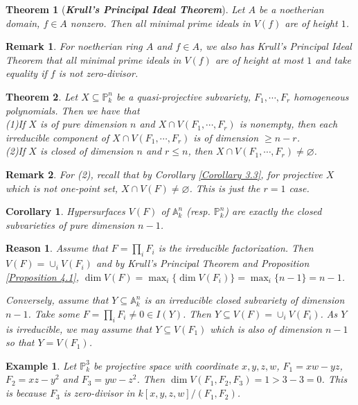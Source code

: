 \documentclass{ctexart}
\newtheorem{remark}{Remark}[section]
\newtheorem{theorem}{Theorem}[section]
\newtheorem{reason}{Reason}[section]
\newtheorem{example}{Example}[section]
\newtheorem{corollary}{Corollary}[section]
\begin{document}
\begin{theorem}[\textbf{\emph{Krull's Principal Ideal Theorem}}]
    Let $A$ be a noetherian domain, $f\in A$ nonzero.
    Then all minimal prime ideals in $V(f)$ are of height $1$.
    \label{Theorem 4.3}
\end{theorem}
\begin{remark}
    For noetherian ring $A$ and $f\in A$, we also has Krull's Principal Ideal Theorem that all minimal prime ideals in $V(f)$ are of height at most $1$ and take equality if $f$ is not zero-divisor.
\end{remark}
\begin{theorem}
    Let $X \subseteq \mathbb{P}_{k}^{n}$ be a quasi-projective subvariety, $F_{1}, \cdots, F_{r}$ homogeneous polynomials.
    Then we have that \\
    (1)If $X$ is of pure dimension $n$ and $X \cap V(F_{1}, \cdots, F_{r})$ is nonempty, 
    then each irreducible component of $X \cap V(F_{1}, \cdots, F_{r})$ is of dimension $\ge n - r$. \\
    (2)If $X$ is closed of dimension $n$ and $r \le n$, then $X \cap V(F_{1}, \cdots, F_{r}) \neq \varnothing$.
    \label{Theorem 4.4} 
\end{theorem}
\begin{remark}
    For (2), recall that by Corollary \ref{Corollary 3.3}, 
    for projective $X$ which is not one-point set, $X \cap V(F) \neq \varnothing$.
    This is just the $r = 1$ case.
\end{remark}
\begin{corollary}
    Hypersurfaces $V(F)$ of $\mathbb{A}_{k}^{n}$ (resp. $\mathbb{P}_{k}^{n}$) are exactly the closed subvarieties of pure dimension $n - 1$.
    \label{Corollary 4.4}
\end{corollary}
\begin{reason}
    Assume that $F = \prod_{i} F_{i}$ is the irreducible factorization.
    Then $V(F) = \cup_{i} V(F_{i})$ and by Krull's Principal Theorem and Proposition \ref{Proposition 4.1}, 
    $\dim V(F) = \max_{i} \{\dim V(F_{i})\} = \max_{i} \{n - 1\} = n - 1$.
    \par
    Conversely, assume that $Y \subseteq \mathbb{A}_{k}^{n}$ is an irreducible closed subvariety of dimension $n - 1$.
    Take some $F = \prod_{i} F_{i} \neq 0\in I(Y)$.
    Then $Y \subseteq V(F) = \cup_{i} V(F_{i})$.
    As $Y$ is irreducible, we may assume that $Y \subseteq V(F_{1})$ which is also of dimension $n - 1$ so that $Y = V(F_{1})$.
\end{reason}
\begin{example}
    Let $\mathbb{P}_{k}^{3}$ be projective space with coordinate $x, y, z, w$, 
    $F_{1} = xw - yz$, $F_{2} = xz - y^2$ and $F_{3} = yw - z^2$.
    Then $\dim V(F_{1}, F_{2}, F_{3}) = 1 > 3 - 3 = 0$.
    This is because $F_{3}$ is zero-divisor in $k[x, y, z, w]/(F_{1}, F_{2})$.
\end{example}
\end{document}

